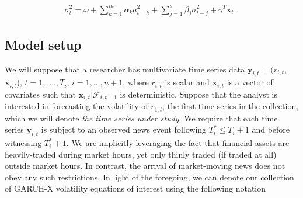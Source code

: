 \documentclass{uiucthesis2021}
\newcommand{\y}{\textbf{y}}
\newcommand{\x}{\textbf{x}}
\theoremstyle{definition}
\begin{document}
\begin{align}
\sigma_{t}^{2} = \omega+ \sum^{m}_{k=1}\alpha_{k}a^{2}_{t-k} + \sum_{j=1}^{s}\beta_{j}\sigma_{t-j}^{2} + \gamma^{T}\x_{t} \text{ .}\label{GARCH-X}
\end{align}


\subsection{Model setup}
\label{modelsetup}
We will suppose that a researcher has multivariate time series data $\y_{i,t} = (r_{i,t}$, $\x_{i,t}$), $t = 1,$ $\ldots,  T_i$, $i = 1, \ldots, n+1$, where $r_{i,t}$ is scalar and $\x_{i,t}$ is a vector of covariates such that $\x_{i,t}|\mathcal{F}_{i,t-1}$ is deterministic.  Suppose that the analyst is interested in forecasting the volatility of $r_{1,t}$, the first time series in the collection, which we will denote \textit{the time series under study}.  We require that each time series $\y_{i,t}$ is subject to an observed news event following $T^*_i \leq T_{i} + 1$ and before witnessing $T^*_i+1$.  We are implicitly leveraging the fact that financial assets are heavily-traded during market hours, yet only thinly traded (if traded at all) outside market hours.  In contrast, the arrival of market-moving news does not obey any such restrictions.  In light of the foregoing, we can denote our collection of GARCH-X volatility equations of interest using the following notation
\end{document}
